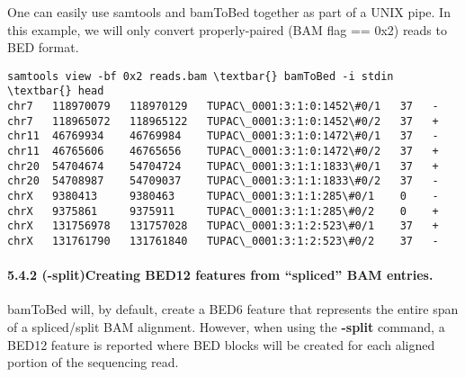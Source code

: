 \documentclass[letterpaper,10pt,english]{sphinxmanual}
\begin{document}
One can easily use samtools and bamToBed together as part of a UNIX pipe. In this example, we will
only convert properly-paired (BAM flag == 0x2) reads to BED format.

\begin{Verbatim}[commandchars=\\\{\}]
samtools view -bf 0x2 reads.bam \textbar{} bamToBed -i stdin \textbar{} head
chr7   118970079   118970129   TUPAC\_0001:3:1:0:1452\#0/1   37   -
chr7   118965072   118965122   TUPAC\_0001:3:1:0:1452\#0/2   37   +
chr11  46769934    46769984    TUPAC\_0001:3:1:0:1472\#0/1   37   -
chr11  46765606    46765656    TUPAC\_0001:3:1:0:1472\#0/2   37   +
chr20  54704674    54704724    TUPAC\_0001:3:1:1:1833\#0/1   37   +
chr20  54708987    54709037    TUPAC\_0001:3:1:1:1833\#0/2   37   -
chrX   9380413     9380463     TUPAC\_0001:3:1:1:285\#0/1    0    -
chrX   9375861     9375911     TUPAC\_0001:3:1:1:285\#0/2    0    +
chrX   131756978   131757028   TUPAC\_0001:3:1:2:523\#0/1    37   +
chrX   131761790   131761840   TUPAC\_0001:3:1:2:523\#0/2    37   -
\end{Verbatim}


\paragraph{5.4.2 (-split)Creating BED12 features from ``spliced'' BAM entries.}
\label{content/bamToBed:split-creating-bed12-features-from-spliced-bam-entries}
bamToBed will, by default, create a BED6 feature that represents the entire span of a spliced/split
BAM alignment. However, when using the \textbf{-split} command, a BED12 feature is reported where BED
blocks will be created for each aligned portion of the sequencing read.
\end{document}
